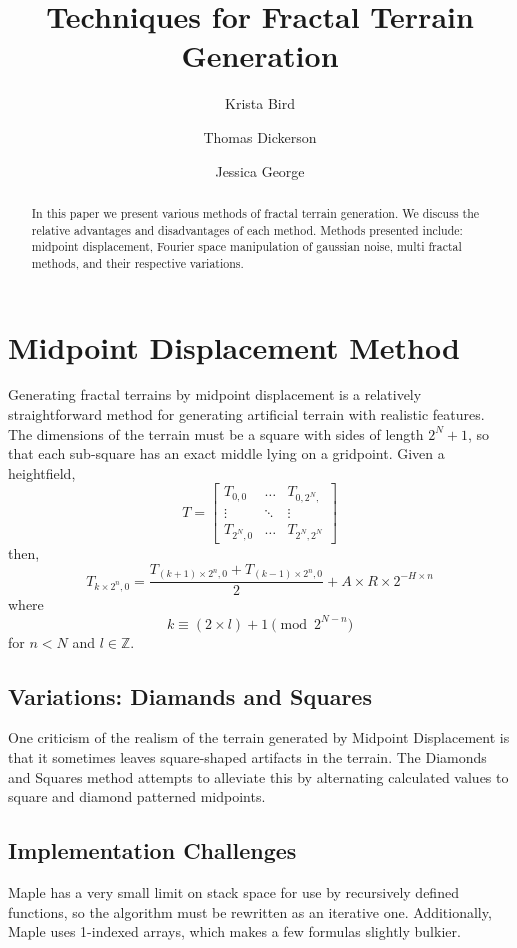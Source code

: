 \documentclass{article}
\title{Techniques for Fractal Terrain Generation}
\author{Krista Bird \and Thomas Dickerson \and Jessica George}
\begin{document}
    \maketitle

     \begin{abstract}
     In this paper we present various methods of fractal terrain generation. We discuss the relative advantages and disadvantages of each method. Methods presented include: midpoint displacement, Fourier space manipulation of gaussian noise, multi fractal methods, and their respective variations. 
     \end{abstract}

	\section{Midpoint Displacement Method}
		Generating fractal terrains by midpoint displacement is a relatively straightforward method for generating artificial terrain with realistic features. The dimensions of the terrain must be a square with sides of length $2^{N}+1$, so that each sub-square has an exact middle lying on a gridpoint. Given a heightfield,
		\begin{equation}
		T = \left[ \begin{matrix}
		T_{0,0} & \ldots & T_{0,2^{N},} \\
		\vdots  &  \ddots & \vdots \\
		T_{2^{N},0} & \ldots & T_{2^{N},2^{N}}
		\end{matrix} \right]
		\end{equation}
then,
		\begin{equation}
			T_{k \times 2^{n},0} = \frac{T_{(k+1) \times 2^{n},0} + T_{(k-1) \times 2^{n},0}}{2} + A \times R \times 2^{-H \times n}
		\end{equation}
where
		\begin{equation}
			k \equiv (2 \times l)+1 \pmod{2^{N-n}}
		\end{equation}
for $n < N$ and $l \in \mathbb{Z}$.
	\subsection{Variations: Diamands and Squares}
		One criticism of the realism of the terrain generated by Midpoint Displacement is that it sometimes leaves square-shaped artifacts in the terrain. The Diamonds and Squares method attempts to alleviate this by alternating calculated values to square and diamond patterned midpoints. 
	\subsection{Implementation Challenges}
		Maple has a very small limit on stack space for use by recursively defined functions, so the algorithm must be rewritten as an iterative one.
		Additionally, Maple uses 1-indexed arrays, which makes a few formulas slightly bulkier.
\end{document}
